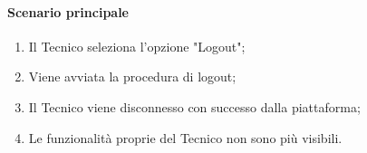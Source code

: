 \paragraph*{Scenario principale}
\begin{enumerate}
  \item Il Tecnico seleziona l'opzione "Logout";
  \item Viene avviata la procedura di logout;
  \item Il Tecnico viene disconnesso con successo dalla piattaforma;
  \item Le funzionalità proprie del Tecnico non sono più visibili.
\end{enumerate}

